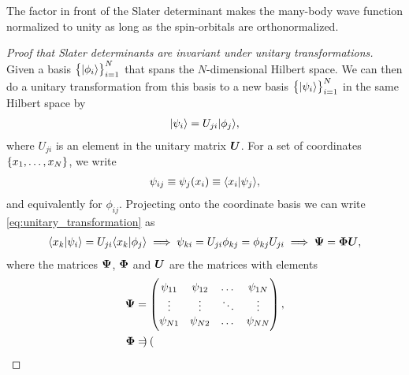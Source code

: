         The factor in front of the Slater determinant makes the many-body wave
        function normalized to unity as long as the spin-orbitals are
        orthonormalized.

        \begin{proof}[Proof that Slater determinants are invariant under unitary
            transformations]
            \label{proof:slater_determinants_invariant}
            Given a basis $\left\{ | \phi_i \rangle \right\}_{i = 1}^{N}$ that spans the
            $N$-dimensional Hilbert space. We can then do a unitary
            transformation from this basis to a new basis
            $\left\{ | \psi_i \rangle \right\}_{i = 1}^{N}$ in the same Hilbert space by
            \begin{align}
                | \psi_i \rangle = U_{ji}| \phi_j \rangle,
                \label{eq:unitary_transformation}
            \end{align}
            where $U_{ji}$ is an element in the unitary matrix $\boldsymbol{U}$.
            For a set of coordinates
            $\left\{ x_1, \dots, x_N \right\}$, we write
            \begin{align}
                \psi_{ij} \equiv \psi_j(x_i)
                \equiv \langle x_i | \psi_j \rangle,
            \end{align}
            and equivalently for $\phi_{ij}$. Projecting onto the coordinate
            basis we can write \autoref{eq:unitary_transformation} as
            \begin{gather}
                \langle x_k | \psi_i \rangle
                = U_{ji}\langle x_k | \phi_j \rangle
                \implies
                \psi_{ki} = U_{ji}\phi_{kj} = \phi_{kj}U_{ji}
                \implies \boldsymbol{\Psi} = \boldsymbol{\Phi}\boldsymbol{U},
            \end{gather}
            where the matrices $\boldsymbol{\Psi}$, $\boldsymbol{\Phi}$ and $\boldsymbol{U}$ are
            the matrices with elements
            \begin{align}
                \boldsymbol{\Psi}
                &= \begin{pmatrix}
                    \psi_{11} & \psi_{12} & \dots & \psi_{1N} \\
                    \vdots & \vdots & \ddots & \vdots \\
                    \psi_{N1} & \psi_{N2} & \dots & \psi_{NN}
                \end{pmatrix}, \\
                \boldsymbol{\Phi}
                &= \begin{pmatrix}

\end{pmatrix}
\end{align}
\end{proof}
